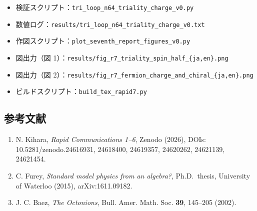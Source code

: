 \documentclass[
  a4paper,
]{ltjsarticle}
\providecommand{\tightlist}{%
  \setlength{\itemsep}{0pt}\setlength{\parskip}{0pt}}
\begin{document}
\begin{itemize}
\tightlist
\item
  検証スクリプト：\texttt{tri\_loop\_n64\_triality\_charge\_v0.py}
\item
  数値ログ：\texttt{results/tri\_loop\_n64\_triality\_charge\_v0.txt}
\item
  作図スクリプト：\texttt{plot\_seventh\_report\_figures\_v0.py}
\item
  図出力（図
  1）：\texttt{results/fig\_r7\_triality\_spin\_half\_\{ja,en\}.png}
\item
  図出力（図
  2）：\texttt{results/fig\_r7\_fermion\_charge\_and\_chiral\_\{ja,en\}.png}
\item
  ビルドスクリプト：\texttt{build\_tex\_rapid7.py}
\end{itemize}

\subsection{参考文献}\label{ux53c2ux8003ux6587ux732e}

\begin{enumerate}
\def\labelenumi{\arabic{enumi}.}
\tightlist
\item
  N. Kihara, \emph{Rapid Communications 1--6}, Zenodo (2026), DOIs:
  10.5281/zenodo.24616931, 24618400, 24619357, 24620262, 24621139,
  24621454.
\item
  C. Furey, \emph{Standard model physics from an algebra?},
  Ph.D.~thesis, University of Waterloo (2015), arXiv:1611.09182.
\item
  J. C. Baez, \emph{The Octonions}, Bull. Amer. Math. Soc. \textbf{39},
  145--205 (2002).
\end{enumerate}
\end{document}
